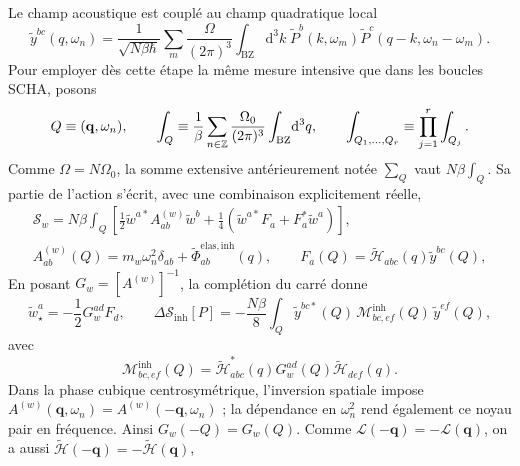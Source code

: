 Le champ acoustique est couplé au champ quadratique local
\begin{equation}
\widetilde y^{bc}(q,\omega_n)
=\frac{1}{\sqrt{N\beta\hbar}}\sum_m
\frac{\Omega}{(2\pi)^3}\int_{\mathrm{BZ}}\!\mathrm d^3k\;
\widetilde P^b(k,\omega_m)
\widetilde P^c(q-k,\omega_n-\omega_m).
\label{eq:core_y_quadratic}
\end{equation}
Pour employer dès cette étape la même mesure intensive que dans les boucles
SCHA, posons
\begin{equation}
Q\equiv(\mathbf q,\omega_n),\qquad
\int_Q\equiv
\frac{1}{\beta}\sum_{n\in\mathbb Z}
\frac{\Omega_0}{(2\pi)^3}\int_{\rm BZ}\!\mathrm d^3q,
\qquad
\int_{Q_1,\ldots,Q_r}\equiv\prod_{j=1}^{r}\int_{Q_j}.
\label{eq:core_compact_Q_measure}
\end{equation}
Comme $\Omega=N\Omega_0$, la somme extensive antérieurement notée $\sum_Q$
vaut $N\beta\int_Q$.
Sa partie de l'action s'écrit, avec une combinaison explicitement réelle,
\begin{equation}
\begin{aligned}
\mathcal S_w
=N\beta\int_Q\left[
\frac12\widetilde w^{a*}A^{(w)}_{ab}\widetilde w^b
+\frac14\left(\widetilde w^{a*}F_a+F_a^*\widetilde w^a\right)
\right],\\
A^{(w)}_{ab}(Q)=m_w\omega_n^2\delta_{ab}
+\widetilde\Phi^{\mathrm{elas,inh}}_{ab}(q),
\qquad
F_a(Q)=\widetilde{\mathcal H}_{abc}(q)\widetilde y^{bc}(Q),
\end{aligned}
\label{eq:core_acoustic_action}
\end{equation}
En posant $G_w=[A^{(w)}]^{-1}$, la complétion du carré donne
\begin{equation}
\widetilde w_\star^a=-\frac12G_w^{ad}F_d,
\qquad
\Delta\mathcal S_{\mathrm{inh}}[P]
=-\frac{N\beta}{8}\int_Q
\widetilde y^{bc*}(Q)\,
\mathcal M^{\mathrm{inh}}_{bc,ef}(Q)\,
\widetilde y^{ef}(Q),
\label{eq:core_inhomogeneous_elimination}
\end{equation}
avec
\begin{equation}
\mathcal M^{\mathrm{inh}}_{bc,ef}(Q)
=\widetilde{\mathcal H}^{*}_{abc}(q)
G_w^{ad}(Q)\widetilde{\mathcal H}_{def}(q).
\label{eq:core_inhomogeneous_vertex}
\end{equation}
Dans la phase cubique centrosymétrique, l'inversion spatiale impose
$A^{(w)}(\mathbf q,\omega_n)=A^{(w)}(-\mathbf q,\omega_n)$ ; la dépendance
en $\omega_n^2$ rend également ce noyau pair en fréquence. Ainsi
$G_w(-Q)=G_w(Q)$. Comme
$\mathcal L(-\mathbf q)=-\mathcal L(\mathbf q)$, on a aussi
$\widetilde{\mathcal H}(-\mathbf q)=-\widetilde{\mathcal H}(\mathbf q)$,
